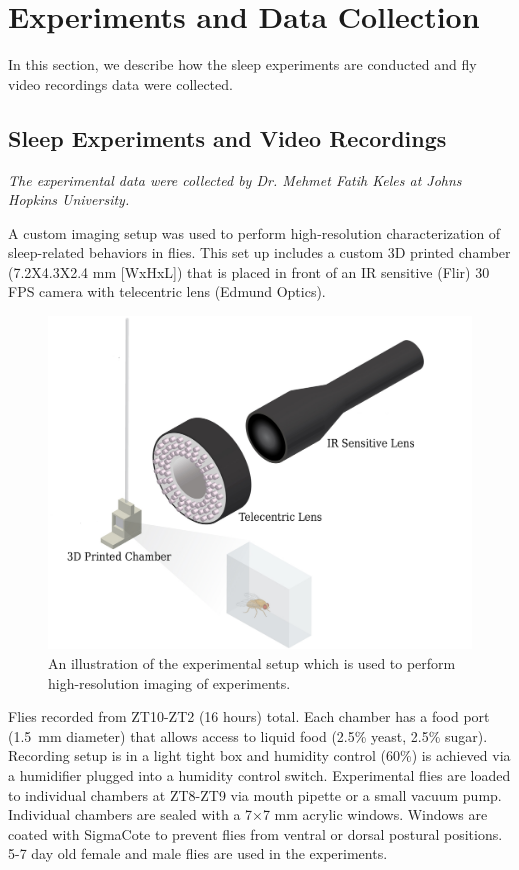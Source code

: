\chapter{Experiments and Data Collection}\label{chapter:expt-data-collection}
In this section, we describe how the sleep experiments are conducted and fly video recordings data were collected.

\section{Sleep Experiments and Video Recordings}

\textit{The experimental data were collected by Dr. Mehmet Fatih Keles at Johns Hopkins University.}

A custom imaging setup was used to perform high-resolution characterization of sleep-related behaviors in flies. This set up includes a custom 3D printed chamber (7.2X4.3X2.4 mm [WxHxL]) that is placed in front of an IR sensitive (Flir) 30 FPS camera with telecentric lens (Edmund Optics).

\begin{figure}[ht!]
	\centering
	\includegraphics[width=0.75\linewidth]{figures/ExperimentalSetup.pdf}
	\caption[An illustration of the experimental setup which is used to perform high-resolution imaging of experiments.]{An illustration of the experimental setup which is used to perform high-resolution imaging of experiments.}
\end{figure}

Flies recorded from ZT10-ZT2 (16 hours) total.
Each chamber has a food port (1.5 mm diameter) that allows access to liquid food (2.5\% yeast, 2.5\% sugar).
Recording setup is in a light tight box and humidity control (60\%) is achieved via a humidifier plugged into a humidity control switch. Experimental flies are loaded to individual chambers at ZT8-ZT9 via mouth pipette or a small vacuum pump.
Individual chambers are sealed with a 7×7 mm acrylic windows.
Windows are coated with SigmaCote to prevent flies from ventral or dorsal postural positions. 5-7 day old female and male flies are used in the experiments.

